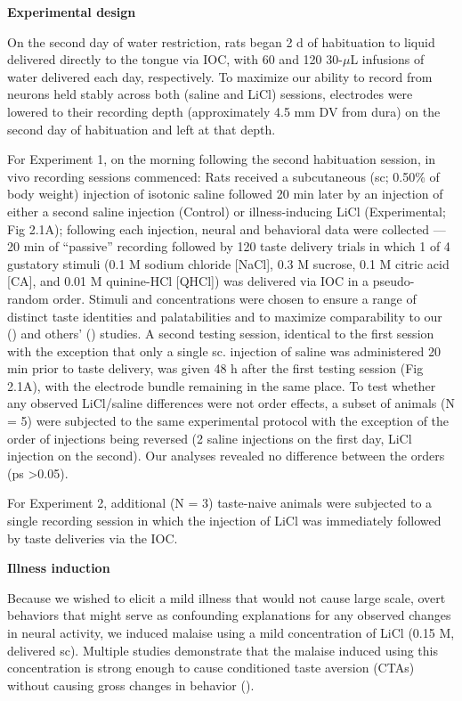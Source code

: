 \begin{refsection}
\smallskip
\noindent\textbf{Experimental design}\par
\noindent 
On the second day of water restriction, rats began 2 d of habituation to liquid delivered directly to the tongue via IOC, with 60 and 120 30-\(\mu\)L infusions of water delivered each day, respectively. To maximize our ability to record from neurons held stably across both (saline and LiCl) sessions, electrodes were lowered to their recording depth (approximately 4.5 mm DV from dura) on the second day of habituation and left at that depth.

For Experiment 1, on the morning following the second habituation session, in vivo recording sessions commenced: Rats received a subcutaneous (sc; 0.50\% of body weight) injection of isotonic saline followed 20 min later by an injection of either a second saline injection (Control) or illness-inducing LiCl (Experimental; Fig 2.1A); following each injection, neural and behavioral data were collected --- 20 min of “passive” recording followed by 120 taste delivery trials in which 1 of 4 gustatory stimuli (0.1 M sodium chloride [NaCl], 0.3 M sucrose, 0.1 M citric acid [CA], and 0.01 M quinine-HCl [QHCl]) was delivered via IOC in a pseudo-random order. Stimuli and concentrations were chosen to ensure a range of distinct taste identities and palatabilities and to maximize comparability to our (\cite{grossman2008a,levitan2019a,moran2014a,sadacca2012a}) and others’ (\cite{spector1988a,samuelsen2012a}) studies. A second testing session, identical to the first session with the exception that only a single sc. injection of saline was administered 20 min prior to taste delivery, was given 48 h after the first testing session (Fig 2.1A), with the electrode bundle remaining in the same place. To test whether any observed LiCl/saline differences were not order effects, a subset of animals (N = 5) were subjected to the same experimental protocol with the exception of the order of injections being reversed (2 saline injections on the first day, LiCl injection on the second). Our analyses revealed no difference between the orders (ps \textgreater 0.05).

For Experiment 2, additional (N = 3) taste-naive animals were subjected to a single recording session in which the injection of LiCl was immediately followed by taste deliveries via the IOC.

\smallskip
\noindent\textbf{Illness induction}\par
\noindent 
Because we wished to elicit a mild illness that would not cause large scale, overt behaviors that might serve as confounding explanations for any observed changes in neural activity, we induced malaise using a mild concentration of LiCl (0.15 M, delivered sc). Multiple studies demonstrate that the malaise induced using this concentration is strong enough to cause conditioned taste aversion (CTAs) without causing gross changes in behavior (\cite{nachman1973a,smith1971a}).


\end{refsection}

